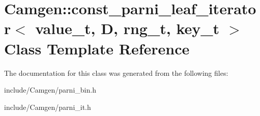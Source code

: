 \hypertarget{a00103}{\section{Camgen\-:\-:const\-\_\-parni\-\_\-leaf\-\_\-iterator$<$ value\-\_\-t, D, rng\-\_\-t, key\-\_\-t $>$ Class Template Reference}
\label{a00103}
}


The documentation for this class was generated from the following files\-:\begin{DoxyCompactItemize}
\item 
include/\-Camgen/parni\-\_\-bin.\-h\item 
include/\-Camgen/parni\-\_\-it.\-h\end{DoxyCompactItemize}
